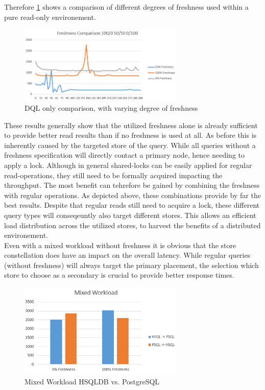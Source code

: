 Therefore \ref{fig:fresh0} shows a comparison of different degrees of freshness used within a pure read-only environement.
\begin{figure}[t] 
    \centering 
    \includegraphics[width=0.7\textwidth]{Figures/fresh0.PNG}
    \caption{DQL only comparison, with varying degree of freshness}
    \label{fig:fresh0}
\end{figure}
These results generally show that the utilized freshness alone is already sufficient to provide better read results than if no freshness is used at all.
As before this is inherently caused by the targeted store of the query. While all queries without a freshness specification will directly contact a primary node,
hence needing to apply a lock. Although in general shared-locks can be easily applied for regular read-operations, they still need to be formally acquired impacting
the throughput. The most benefit can tehrefore be gained by combining the freshness with regular operations. As depicted above, these combinations provide by far 
the best results. Despite that regular reads still need to acquire a lock, these different query types will conseqeuntly also target different stores. 
This allows an efficient load distribution across the utilized stores, to harvest the benefits of a distributed environement.\\


Even with a mixed workload without freshness it is obvious that the store constellation does have an impact on the overall latency.
While regular queries (without freshness) will always target the primary placement, the selection which store to choose as a secondary
is crucial to provide better response times.\\


\begin{figure}[t] 
    \centering 
    \includegraphics[width=0.7\textwidth]{Figures/mixed.PNG}
    \caption{Mixed Workload HSQLDB vs. PostgreSQL}
    \label{fig:mixed}
\end{figure}

